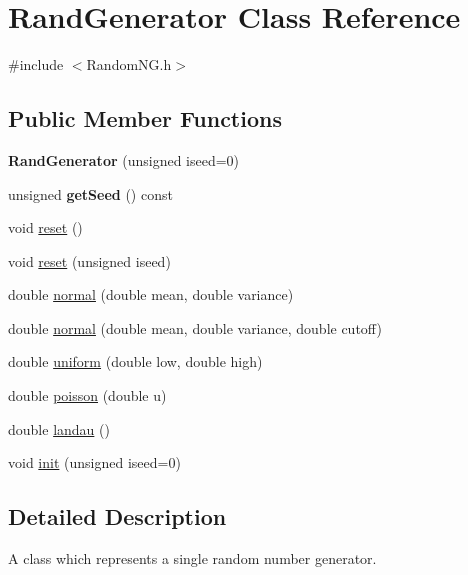 \hypertarget{classRandGenerator}{}\section{Rand\+Generator Class Reference}
\label{classRandGenerator}


{\ttfamily \#include $<$Random\+N\+G.\+h$>$}

\subsection*{Public Member Functions}
\begin{DoxyCompactItemize}
\item 
\mbox{\label{classRandGenerator_acd2c183bfe581a86e0eca06dfde7e833}} 
{\bfseries Rand\+Generator} (unsigned iseed=0)
\item 
\mbox{\label{classRandGenerator_a421d4e9c40a075f130b123f0214039ba}} 
unsigned {\bfseries get\+Seed} () const
\item 
void \hyperlink{classRandGenerator_a7f8d9a54d46bc0bf9ab5b3bf5e369396}{reset} ()
\item 
void \hyperlink{classRandGenerator_a32087c36d8e6d3edda4775532d921132}{reset} (unsigned iseed)
\item 
double \hyperlink{classRandGenerator_a581d2a0a543b4df67361487a2c05125d}{normal} (double mean, double variance)
\item 
double \hyperlink{classRandGenerator_a0cc4c8abf0dd7d376a6574ec25617a41}{normal} (double mean, double variance, double cutoff)
\item 
double \hyperlink{classRandGenerator_a7a6a4584608b9a834c83767606204695}{uniform} (double low, double high)
\item 
double \hyperlink{classRandGenerator_a73dbeaf8bc87bb14c4a5be15c554f08f}{poisson} (double u)
\item 
double \hyperlink{classRandGenerator_a3469bd4f50eafa47d6b60441f4b3207b}{landau} ()
\item 
void \hyperlink{classRandGenerator_a9267feee8104be313e92a678c9f75bb2}{init} (unsigned iseed=0)
\end{DoxyCompactItemize}


\subsection{Detailed Description}
A class which represents a single random number generator. 

